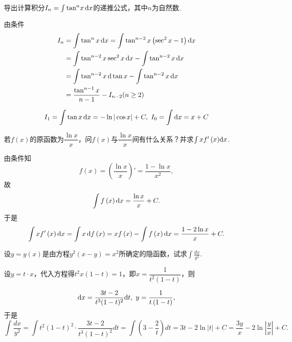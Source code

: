 \begin{problem}
	导出计算积分$I_{n} = \int {\tan}^{n}{x\d x}$的递推公式，其中$n$为自然数.
	
	\begin{solution}
		由条件
		$$\begin{aligned} I_{n} &=\int \tan ^{n} x \d x=\int \tan ^{n-2} x\left(\sec ^{2} x-1\right) \d x \\ &=\int \tan ^{n-2} x \sec ^{2} x \d x-\int \tan ^{n-2} x \d x \\ &=\int \tan ^{n-2} x \d \tan x-\int \tan ^{n-2} x \d x \\ &=\frac{\tan ^{n-1} x}{n-1}-I_{n-2}(n \geq 2)  \end{aligned}$$
	\end{solution}
$$I_{1} =\int \tan x \d x=-\ln |\cos x|+C, \ I_{0}=\int \d x=x+C$$
\end{problem}

\begin{problem}
	若$f\left( x \right)$的原函数为$\dfrac{\ln x}{x}$，问$f\left( x \right)$与$\dfrac{\ln x}{x}$间有什么关系？并求$\int{xf'\left( x \right)}{\d}x$.
	
	\begin{solution}
		由条件知
		$$f\left( x \right) = \left( \frac{\ln x}{x} \right)' = \frac{1 - \ln x}{x^{2}},$$
		故
		$$\int{f\left( x \right){\mathop{}\!\mathrm{d}x}} = \frac{\ln x}{x} + C.$$
	于是
	$$\int{xf'\left( x \right){\dx}} = \int x\d f\left( x \right) ={xf}\left( x \right) - \int{f\left( x \right){\dx}} = \frac{1 - 2\ln x}{x} + C.$$
	\end{solution}
\end{problem}


\begin{problem}
	设$y = y\left( x \right)$是由方程$y^{2}\left( x - y \right) = x^{2}$所确定的隐函数，试求$\displaystyle \int\frac{{dx}}{y^{2}}.$
	
	\begin{solution}
		设$y = t \cdot x$，代入方程得$t^{2}x\left( 1 - t \right) = 1$，即$x = \dfrac{1}{t^{2}\left( 1 - t \right)}$，则
	
	$$\mathop{}\!\mathrm{d} x = \frac{3t - 2}{t^{3}(1 - t)^{2}}{\mathop{}\!\mathrm{d} t},\ y = \frac{1}{t\left( 1 - t \right)},$$
	于是
	$$\int\frac{{dx}}{y^{2}} = \int {t^{2}\left( 1 - t \right)^{2} \cdot \frac{3t - 2}{t^{3}\left( 1 - t \right)^{2}}}dt = \int {\left( 3 - \frac{2}{t} \right)dt = 3t - 2\ln\left| t \right|} + C = \frac{3y}{x} - 2\ln\left| \frac{y}{x} \right| + C.$$
	\end{solution}
\end{problem}


